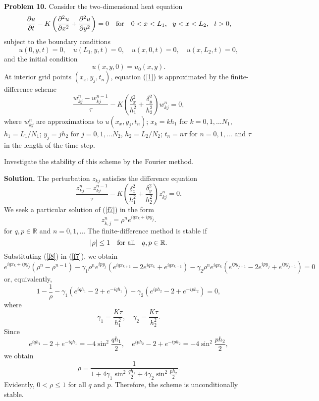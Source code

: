 \documentclass[10pt]{article}
\begin{document}

\vskip 0.5cm \noindent
{\bf Problem 10.} Consider the two-dimensional heat equation
\begin{equation}
\frac{\partial u}{\partial t}-K \left(\frac{\partial^{2}u}{\partial
x^{2}}+\frac{\partial^{2}u}{\partial
y^{2}}\right)=0 \quad \hbox{for} \quad 0<x<L_{1}, \ \ y<x<L_{2}, \ \ t>0, \label{1}
\end{equation}
subject to the boundary conditions
\[
u(0,y,t)=0, \quad u(L_{1},y,t)=0, \quad
u(x,0,t)=0, \quad u(x,L_{2},t)=0,
\]
and the initial condition
\[
u(x,y,0)=u_{0}(x,y).
\]
At interior grid points $(x_{x},y_{j},t_{n})$, equation (\ref{1}) is approximated by the finite-difference scheme
\[
\frac{w_{kj}^{n}-w_{kj}^{n-1}}{\tau} -K\left(\frac{\delta_{x}^2}{h_{1}^2}
+\frac{\delta_{y}^2}{h_{2}^2}\right)w_{kj}^{n}=0,
\]
where $w_{kj}^{n}$ are approximations to $u(x_{x},y_{j},t_{n})$; $x_{k}=k h_{1}$ for $k=0,1,\dots N_{1}$,
$h_{1}=L_{1}/N_{1}$; $y_{j}=j h_{2}$ for $j=0,1,\dots N_{2}$,
$h_{2}=L_{2}/N_{2}$; $t_{n}=n\tau$ for $n=0,1,\dots$ and $\tau$ in the length of the time step.

\vskip 0.3cm
\noindent
Investigate the stability of this scheme by the Fourier method.

\vskip 0.5cm \noindent
{\bf Solution.}
The perturbation  $z_{kj}$ satisfies the difference equation
\begin{equation}
\frac{z_{kj}^{n}-z_{kj}^{n-1}}{\tau} -K\left(\frac{\delta_{x}^2}{h_{1}^2}
+\frac{\delta_{y}^2}{h_{2}^2}\right)z_{kj}^{n}=0. \label{f7}
\end{equation}
We seek a particular solution of
(\ref{f7}) in the form
\begin{equation}
z^{n}_{k,j}=\rho^{n}e^{iqx_{k}+ipy_{j}}. \label{f8}
\end{equation}
for $q,p\in{\mathbb R}$ and $n=0,1,\dots$
The finite-difference method is stable if
\[
\vert\rho\vert\leq 1 \quad {\rm for \ all } \quad q,p\in{\mathbb R}.
\]
Substituting (\ref{f8}) in (\ref{f7}), we obtain
\[
e^{iqx_{k}+ipy_{j}}\left(\rho^{n}-\rho^{n-1}\right) -
\gamma_{1}\rho^{n}e^{ipy_{j}}
\left(e^{iqx_{k+1}}-2e^{iqx_{k}}+e^{iqx_{k-1}}\right)-
\gamma_{2}\rho^{n}e^{iqx_{k}}
\left(e^{ipy_{j+1}}-2e^{ipy_{j}}+e^{ipy_{j-1}}\right)=0
\]
or, equivalently,
\[
1-\frac{1}{\rho}-\gamma_{1}
\left(e^{iqh_{1}}-2+e^{-iqh_{1}}\right)-
\gamma_{2}\left(e^{iph_{2}}-2+e^{-iph_{2}}\right)=0,
\]
where
\[
\gamma_{1}=\frac{K\tau}{h_{1}^2}, \quad
\gamma_{2}=\frac{K\tau}{h_{2}^2}.
\]
Since
\[
e^{iqh_{1}}-2+e^{-iqh_{1}}=-4\sin^{2} \frac{qh_{1}}{2}, \quad
e^{iph_{2}}-2+e^{-iph_{2}}=-4\sin^{2} \frac{ph_{2}}{2},
\]
we obtain
\[
\rho=\frac{1}{1+4\gamma_{1}\sin^{2} \frac{qh_{1}}{2}
+4\gamma_{2}\sin^{2} \frac{ph_{2}}{2}}.
\]
Evidently, $0<\rho\leq 1$ for all $q$ and $p$. Therefore,
the scheme is unconditionally stable.
\end{document}
